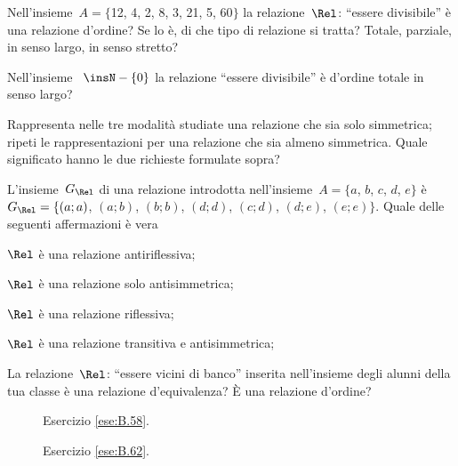 \begin{multicols}{2}
\begin{esercizio}
\label{ese:B.49}
Nell'insieme~$A = \{$12, 4, 2, 8, 3, 21, 5, 60$\}$ la relazione~$\Rel$: ``essere divisibile'' è una relazione d'ordine? Se lo è, di che tipo di relazione si tratta? Totale, parziale, in senso largo, in senso stretto?
\end{esercizio}

\begin{esercizio}
\label{ese:B.50}
Nell'insieme ~$\insN - \{ 0 \}$ la relazione ``essere divisibile'' è d'ordine totale in senso largo?
\end{esercizio}

\begin{esercizio}
\label{ese:B.51}
Rappresenta nelle tre modalità studiate una relazione che sia solo simmetrica; ripeti le rappresentazioni per una relazione che sia almeno simmetrica. Quale significato hanno le due richieste formulate sopra?
\end{esercizio}

\begin{esercizio}
\label{ese:B.52}
L'insieme~$G_\Rel$ di una relazione introdotta nell'insieme~$A = \{a$, $b$, $c$, $d$, $e\}$ è~$G_\Rel = \{ (a;a)$, $(a;b)$, $(b;b)$, $(d;d)$, $(c;d)$, $(d;e)$, $(e;e)\}$.
Quale delle seguenti affermazioni è vera
\begin{enumeratea}
\item $\Rel$ è una relazione antiriflessiva;
\item $\Rel$ è una relazione solo antisimmetrica;
\item $\Rel$ è una relazione riflessiva;
\item $\Rel$ è una relazione transitiva e antisimmetrica;
\end{enumeratea}
\end{esercizio}

\begin{esercizio}
\label{ese:B.53}
La relazione~$\Rel$: ``essere vicini di banco'' inserita nell'insieme degli alunni della tua classe è una
relazione d'equivalenza? \`E una relazione d'ordine?
\end{esercizio}

\end{multicols}

\begin{figure}[t]
\begin{minipage}[b]{1\textwidth}
 \centering
 
 \caption{Esercizio \ref{ese:B.58}.}\label{fig:B.22}
\end{minipage}
\hfill
\begin{minipage}[b]{\textwidth}
 \centering
 
 \caption{Esercizio \ref{ese:B.62}.}\label{fig:B.23}
\end{minipage}
\end{figure}

